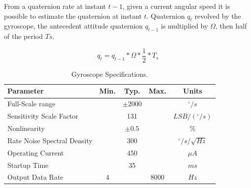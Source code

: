 From a quaternion rate at instant $t-1$, given a current angular speed it is possible to estimate the quaternion at instant $t$. Quaternion $q_t$ revolved by the gyroscope, the antecedent attitude quaternion $q_{t−1}$ is multiplied by $\Omega$, then half of the period $Ts$.

\begin{equation}
    q_t = q_{t-1} \ast \Omega \ast \frac{1}{2} \ast T_s
\end{equation}

\begin{table}[H]
    \begin{center}
        \begin{tabular}[t]{lcccc}
            \hline
            Parameter                   & Min. & Typ.       & Max.   & Units                  \\
            \hline
            Full-Scale range            &      & $\pm 2000$ &        & $^{\circ}/s$           \\
            Sensitivity Scale Factor    &      & 131        &        & $LSB/(^{\circ}/s)$     \\
            Nonlinearity                &      & $\pm 0.5$  &        & $\%$                   \\
            Rate Noise Spectral Density &      & 300        &        & $^{\circ}/s/\sqrt{Hz}$ \\
            Operating Current           &      & 450        &        & $\mu A$                \\
            Startup Time                &      & 35         &        & $ms$                   \\
            Output Data Rate            & $4$  &            & $8000$ & $Hz$                   \\
            \hline
        \end{tabular}
        \caption{Gyroscope Specifications. }
        \label{tab:gyroscope_specification}
    \end{center}
\end{table}

